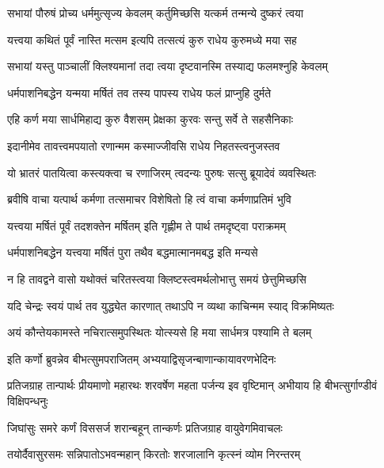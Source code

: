 \twolineshloka
{सभायां पौरुषं प्रोच्य धर्ममुत्सृज्य केवलम्}
{कर्तुमिच्छसि यत्कर्म तन्मन्ये दुष्करं त्वया}



\twolineshloka
{यत्त्वया कथितं पूर्वं नास्ति मत्सम इत्यपि}
{तत्सत्यं कुरु राधेय कुरुमध्ये मया सह}


\twolineshloka
{सभायां यस्तु पाञ्चालीं क्लिश्यमानां तदा त्वया}
{दृष्टवानस्मि तस्याद्य फलमश्नुहि केवलम्}


\twolineshloka
{धर्मपाशनिबद्धेन यन्मया मर्षितं तव}
{तस्य पापस्य राधेय फलं प्राप्नुहि दुर्मते}


\twolineshloka
{एहि कर्ण मया सार्धमिहाद्य कुरु वैशसम्}
{प्रेक्षका कुरवः सन्तु सर्वे ते सहसैनिकाः}


\twolineshloka
{इदानीमेव तावत्त्वमपयातो रणान्मम}
{कस्माज्जीवसि राधेय निहतस्त्वनुजस्तव}


\twolineshloka
{यो भ्रातरं पातयित्वा कस्त्यक्त्वा च रणाजिरम्}
{त्वदन्यः पुरुषः सत्सु ब्रूयादेवं व्यवस्थितः}




\twolineshloka
{ब्रवीषि वाचा यत्पार्थ कर्मणा तत्समाचर}
{विशेषितो हि त्वं वाचा कर्मणाप्रतिमं भुवि}


\twolineshloka
{यत्त्वया मर्षितं पूर्वं तदशक्तेन मर्षितम्}
{इति गृह्णीम ते पार्थ तमदृष्ट्वा पराक्रमम्}


\twolineshloka
{धर्मपाशनिबद्धेन यत्त्वया मर्षितं पुरा}
{तथैव बद्धमात्मानमबद्ध इति मन्यसे}


\twolineshloka
{न हि तावद्वने वासो यथोक्तं चरितस्त्वया}
{क्लिष्टस्त्वमर्थलोभात्तु समयं छेत्तुमिच्छसि}


\twolineshloka
{यदि चेन्द्रः स्वयं पार्थ तव युद्ध्येत कारणात्}
{तथाऽपि न व्यथा काचिन्मम स्याद् विक्रमिष्यतः}


\twolineshloka
{अयं कौन्तेयकामस्ते नचिरात्समुपस्थितः}
{योत्स्यसे हि मया सार्धमत्र पश्यामि ते बलम्}



\twolineshloka
{इति कर्णो ब्रुवन्नेव बीभत्सुमपराजितम्}
{अभ्ययाद्विसृजन्बाणान्कायावरणभेदिनः}


\onelineshloka
{प्रतिजग्राह तान्पार्थः प्रीयमाणो महारथः}
\twolineshloka
{शरवर्षेण महता पर्जन्य इव वृष्टिमान्}
{अभीयाय हि बीभत्सुर्गाण्डीवं विक्षिपन्धनुः}


\twolineshloka
{जिघांसुः समरे कर्णं विससर्ज शरान्बहून्}
{तान्कर्णः प्रतिजग्राह वायुवेगमिवाचलः}


\twolineshloka
{तयोर्दैवासुरसमः सन्निपातोऽभवन्महान्}
{किरतोः शरजालानि कृत्स्नं व्योम निरन्तरम्}


